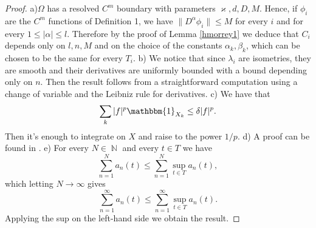 \documentclass[12pt]{article}
\theoremstyle{definition}
\DeclareMathOperator\nn{\mathbb{N}}
\begin{document}
\begin{proof}
a)$\Omega$ has a resolved $C^m$ boundary with parameters $\varkappa,d,D,M$. Hence, if $\phi_i$ are the $C^m$ functions of Definition 1, we have $\| D^{\alpha}\phi_i \|\le M$ for every $i$ and for every $1\le|\alpha|\le l$. Therefore by the proof of Lemma \ref{hmorrey1} we deduce that $C_i$ depends only on $l,n,M$ and on the choice of the constants $\alpha_k,\beta_k$, which can be chosen to be the same for every $T_i$.
b) We notice that since $\lambda_i$ are isometries, they are smooth and their derivatives are uniformly bounded with a bound depending only on $n$. Then the result follows from a straightforward computation using a change of variable and the Leibniz rule for derivatives.
c) We have that 
\[ \sum_k |f|^p \mathbbm{1}_{X_k} \le \delta |f|^p. \]
Then it's enough to integrate on $X$ and raise to the power $1/p.$ d) A proof can be found in \cite[Lemma 13]{burenkov}. e) For every $N \in \nn$ and every $t \in T$ we have
\[ \sum_{n=1}^N a_n(t) \le \sum_{n=1}^N \sup_{t \in T} a_n(t),\]
which letting $N \rightarrow \infty$ gives
\[ \sum_{n=1}^\infty a_n(t) \le \sum_{n=1}^\infty \sup_{t \in T} a_n(t). \]
Applying the sup on the left-hand side we obtain the result.

\end{proof}
	


\end{document}
